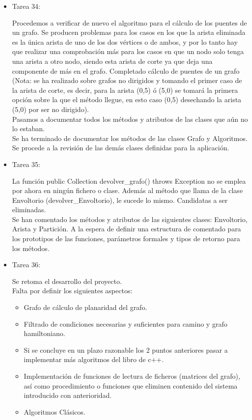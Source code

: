 \begin{itemize}
\item Tarea 34:

Procedemos a verificar de nuevo el algoritmo para el cálculo de los puentes de un grafo. Se producen problemas para los casos en los que la arista eliminada es la única arista de uno de los dos vértices o de ambos, y por lo tanto hay que realizar una comprobación más para los casos en que un nodo solo tenga una arista a otro nodo, siendo esta arista de corte ya que deja una componente de más en el grafo. Completado cálculo de puentes de un grafo (Nota: se ha realizado sobre grafos no dirigidos y tomando el primer caso de la arista de corte, es decir, para la arista (0,5) ó (5,0) se tomará la primera opción sobre la que el método llegue, en esto caso (0,5) desechando la arista (5,0) por ser no dirigido).\\

Pasamos a documentar todos los métodos y atributos de las clases que aún no lo estaban.\\

Se ha terminado de documentar los métodos de las clases Grafo y Algoritmos. Se procede a la revisión de las demás clases definidas para la aplicación.\\

\item Tarea 35:

La función public Collection devolver\_grafo() throws Exception no se emplea por ahora en ningún fichero o clase. Además al método que llama de la clase Envoltorio (devolver\_Envoltorio), le sucede lo mismo. Candidatas a ser eliminadas.\\

Se han comentado los métodos y atributos de las siguientes clases: Envoltorio, Arista y Partición. A la espera de definir una estructura de comentado para los prototipos de las funciones, parámetros formales y tipos de retorno para los métodos.\\

\item Tarea 36:

Se retoma el desarrollo del proyecto.\\

Falta por definir los siguientes aspectos:\\
\begin{itemize}
\item Grafo de cálculo de planaridad del grafo.
\item Filtrado de condiciones necesarias y suficientes para camino y grafo hamiltoniano.
\item Si se concluye en un plazo razonable los 2 puntos anteriores pasar a implementar más algoritmos del libro de c++.
\item Implementación de funciones de lectura de ficheros (matrices del grafo), así como procedimiento o funciones que eliminen contenido del sistema introducido con anterioridad.
\item Algoritmos Clásicos.
\end{itemize}


\end{itemize}
